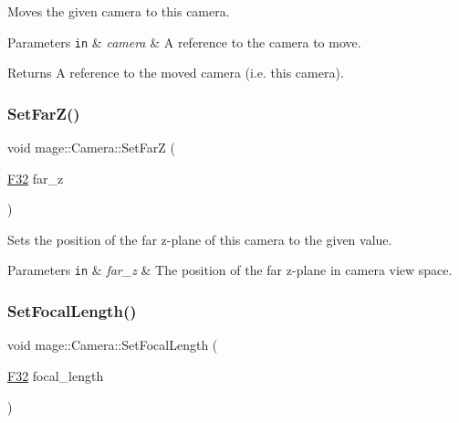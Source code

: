 Moves the given camera to this camera.


\begin{DoxyParams}[1]{Parameters}
\mbox{\tt in}  & {\em camera} & A reference to the camera to move. \\
\hline
\end{DoxyParams}
\begin{DoxyReturn}{Returns}
A reference to the moved camera (i.\+e. this camera). 
\end{DoxyReturn}
\hypertarget{classmage_1_1_camera_aa49995ef824eeb807656921406d248a5}{}\label{classmage_1_1_camera_aa49995ef824eeb807656921406d248a5} 
\subsubsection{\texorpdfstring{Set\+Far\+Z()}{SetFarZ()}}
{\footnotesize\ttfamily void mage\+::\+Camera\+::\+Set\+FarZ (\begin{DoxyParamCaption}\item[{\hyperlink{namespacemage_aa97e833b45f06d60a0a9c4fc22ae02c0}{F32}}]{far\+\_\+z }\end{DoxyParamCaption})\hspace{0.3cm}{\ttfamily [noexcept]}}

Sets the position of the far z-\/plane of this camera to the given value.


\begin{DoxyParams}[1]{Parameters}
\mbox{\tt in}  & {\em far\+\_\+z} & The position of the far z-\/plane in camera view space. \\
\hline
\end{DoxyParams}
\hypertarget{classmage_1_1_camera_a3c4e2c6a00c11ae0f0fd404d3d4f511b}{}\label{classmage_1_1_camera_a3c4e2c6a00c11ae0f0fd404d3d4f511b} 
\subsubsection{\texorpdfstring{Set\+Focal\+Length()}{SetFocalLength()}}
{\footnotesize\ttfamily void mage\+::\+Camera\+::\+Set\+Focal\+Length (\begin{DoxyParamCaption}\item[{\hyperlink{namespacemage_aa97e833b45f06d60a0a9c4fc22ae02c0}{F32}}]{focal\+\_\+length }\end{DoxyParamCaption})\hspace{0.3cm}{\ttfamily [noexcept]}}


